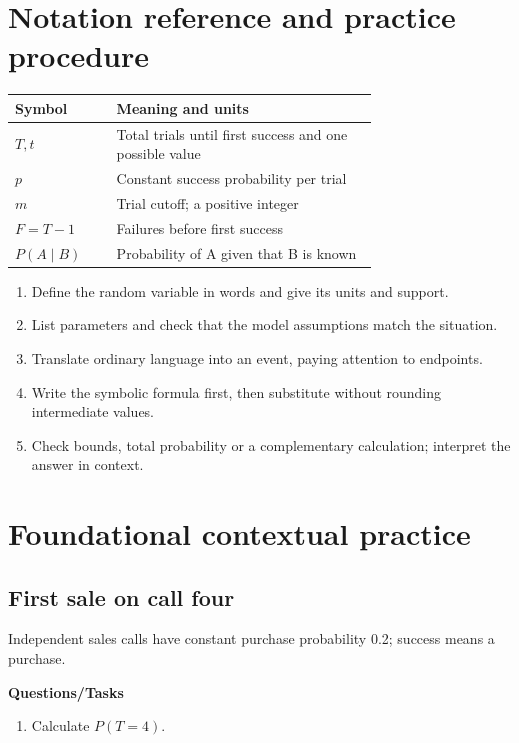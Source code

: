 \section{Notation reference and practice procedure}
\begin{center}
\begin{tabular}{lp{0.72\linewidth}}
\toprule
Symbol & Meaning and units \\ \midrule
$T,t$ & Total trials until first success and one possible value \\
$p$ & Constant success probability per trial \\
$m$ & Trial cutoff; a positive integer \\
$F=T-1$ & Failures before first success \\
$P(A\mid B)$ & Probability of A given that B is known \\
\bottomrule
\end{tabular}
\end{center}
\begin{enumerate}
\item Define the random variable in words and give its units and support.
\item List parameters and check that the model assumptions match the situation.
\item Translate ordinary language into an event, paying attention to endpoints.
\item Write the symbolic formula first, then substitute without rounding intermediate values.
\item Check bounds, total probability or a complementary calculation; interpret the answer in context.
\end{enumerate}
\section{Foundational contextual practice}\label{sec:t2-c5-foundational}
\subsection{First sale on call four}
Independent sales calls have constant purchase probability 0.2; success means a purchase.

\textbf{Questions/Tasks}
\begin{enumerate}
\item Calculate $P(T=4)$. 
\end{enumerate}

